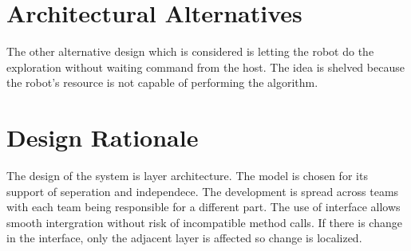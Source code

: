 \documentclass[11pt, a4paper]{report}
\begin{document}
\section{Architectural Alternatives}
The other alternative design which is considered is letting the robot do the exploration without
waiting command from the host. The idea is shelved because the robot's resource is not capable
of performing the algorithm. 



\section{Design Rationale}
The design of the system is layer architecture. The model is chosen for its support of seperation 
and independece. The development is spread across teams with each team being responsible
for a different part. The use of interface allows smooth intergration without risk of 
 incompatible method calls. If there is change in the interface, only the adjacent layer is affected 
 so change is localized. 
\end{document}
